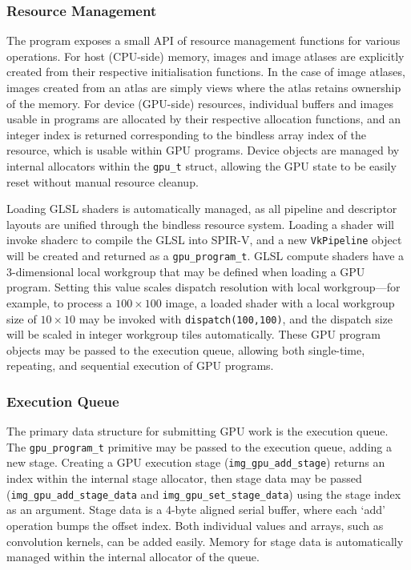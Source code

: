 \documentclass[10pt, a4paper]{article}
\begin{document}
\subsubsection{Resource Management}
The program exposes a small API of resource management functions for various operations. For host (CPU-side) memory, images and image atlases are explicitly created from their respective initialisation functions. In the case of image atlases, images created from an atlas are simply views where the atlas retains ownership of the memory. For device (GPU-side) resources, individual buffers and images usable in programs are allocated by their respective allocation functions, and an integer index is returned corresponding to the bindless array index of the resource, which is usable within GPU programs. Device objects are managed by internal allocators within the \texttt{gpu\_t} struct, allowing the GPU state to be easily reset without manual resource cleanup. 

Loading GLSL shaders is automatically managed, as all pipeline and descriptor layouts are unified through the bindless resource system. Loading a shader will invoke shaderc to compile the GLSL into SPIR-V, and a new \texttt{VkPipeline} object will be created and returned as a \texttt{gpu\_program\_t}. GLSL compute shaders have a 3-dimensional local workgroup that may be defined when loading a GPU program. Setting this value scales dispatch resolution with local workgroup---for example, to process a $100\times100$ image, a loaded shader with a local workgroup size of $10\times10$ may be invoked with \texttt{dispatch(100,100)}, and the dispatch size will be scaled in integer workgroup tiles automatically. These GPU program objects may be passed to the execution queue, allowing both single-time, repeating, and sequential execution of GPU programs. 

\subsubsection{Execution Queue}
The primary data structure for submitting GPU work is the execution queue. The \texttt{gpu\_program\_t} primitive may be passed to the execution queue, adding a new stage. Creating a GPU execution stage (\texttt{img\_gpu\_add\_stage}) returns an index within the internal stage allocator, then stage data may be passed (\texttt{img\_gpu\_add\_stage\_data} and \texttt{img\_gpu\_set\_stage\_data}) using the stage index as an argument. Stage data is a 4-byte aligned serial buffer, where each `add' operation bumps the offset index. Both individual values and arrays, such as convolution kernels, can be added easily. Memory for stage data is automatically managed within the internal allocator of the queue.
\end{document}
